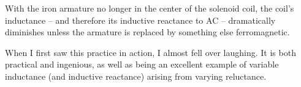 
With the iron armature no longer in the center of the solenoid coil, the coil's inductance -- and therefore its inductive reactance to AC -- dramatically diminishes unless the armature is replaced by something else ferromagnetic.







When I first saw this practice in action, I almost fell over laughing.  It is both practical and ingenious, as well as being an excellent example of variable inductance (and inductive reactance) arising from varying reluctance.




